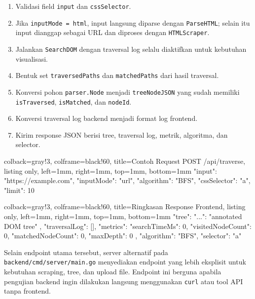 \begin{enumerate}
    \item Validasi field \texttt{input} dan \texttt{cssSelector}.
    \item Jika \texttt{inputMode = html}, input langsung diparse dengan \texttt{ParseHTML}; selain itu input dianggap sebagai URL dan diproses dengan \texttt{HTMLScraper}.
    \item Jalankan \texttt{SearchDOM} dengan traversal log selalu diaktifkan untuk kebutuhan visualisasi.
    \item Bentuk set \texttt{traversedPaths} dan \texttt{matchedPaths} dari hasil traversal.
    \item Konversi pohon \texttt{parser.Node} menjadi \texttt{treeNodeJSON} yang sudah memiliki \texttt{isTraversed}, \texttt{isMatched}, dan \texttt{nodeId}.
    \item Konversi traversal log backend menjadi format log frontend.
    \item Kirim response JSON berisi tree, traversal log, metrik, algoritma, dan selector.
\end{enumerate}

\begin{tcblisting}{
        colback=gray!3,
        colframe=black!60,
        title=Contoh Request POST /api/traverse,
        listing only,
        left=1mm,
        right=1mm,
        top=1mm,
        bottom=1mm
    }
    {
      "input": "https://example.com",
      "inputMode": "url",
      "algorithm": "BFS",
      "cssSelector": "a",
      "limit": 10
    }
\end{tcblisting}

\begin{tcblisting}{
        colback=gray!3,
        colframe=black!60,
        title=Ringkasan Response Frontend,
        listing only,
        left=1mm,
        right=1mm,
        top=1mm,
        bottom=1mm
    }
    {
      "tree": { "...": "annotated DOM tree" },
      "traversalLog": [],
      "metrics": {
        "searchTimeMs": 0,
        "visitedNodeCount": 0,
        "matchedNodeCount": 0,
        "maxDepth": 0
      },
      "algorithm": "BFS",
      "selector": "a"
    }
\end{tcblisting}

Selain endpoint utama tersebut, server alternatif pada \texttt{backend/cmd/server/main.go} menyediakan endpoint yang lebih eksplisit untuk kebutuhan scraping, tree, dan upload file. Endpoint ini berguna apabila pengujian backend ingin dilakukan langsung menggunakan \texttt{curl} atau tool API tanpa frontend.

